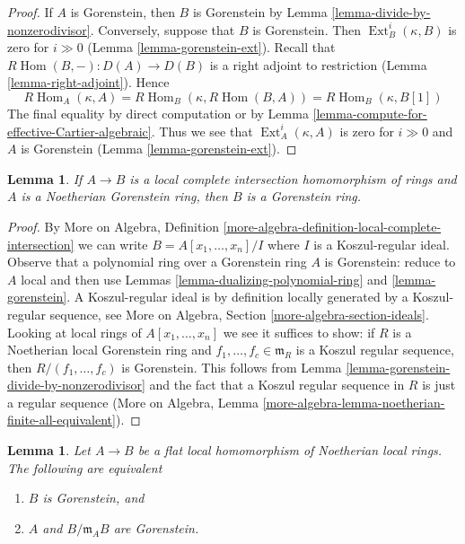 \documentclass{stacks-project}
\theoremstyle{plain}
\newtheorem{lemma}[subsection]{Lemma}
\theoremstyle{definition}
\theoremstyle{remark}
\numberwithin{equation}{subsection}
\def\Hom{\mathop{\mathrm{Hom}}\nolimits}
\def\Ext{\mathop{\mathrm{Ext}}\nolimits}
\begin{document}
\begin{proof}
If $A$ is Gorenstein, then $B$ is Gorenstein by
Lemma \ref{lemma-divide-by-nonzerodivisor}.
Conversely, suppose that $B$ is Gorenstein. Then
$\Ext^i_B(\kappa, B)$ is zero for $i \gg 0$
(Lemma \ref{lemma-gorenstein-ext}).
Recall that $R\Hom(B, -) : D(A) \to D(B)$ is a right adjoint
to restriction (Lemma \ref{lemma-right-adjoint}).
Hence
$$
R\Hom_A(\kappa, A) = R\Hom_B(\kappa, R\Hom(B, A)) =
R\Hom_B(\kappa, B[1])
$$
The final equality by direct computation or by
Lemma \ref{lemma-compute-for-effective-Cartier-algebraic}.
Thus we see that $\Ext^i_A(\kappa, A)$ is zero for
$i \gg 0$ and $A$ is Gorenstein (Lemma \ref{lemma-gorenstein-ext}).
\end{proof}

\begin{lemma}
\label{lemma-gorenstein-lci}
If $A \to B$ is a local complete intersection homomorphism of rings and
$A$ is a Noetherian Gorenstein ring, then $B$ is a Gorenstein ring.
\end{lemma}

\begin{proof}
By More on Algebra, Definition
\ref{more-algebra-definition-local-complete-intersection}
we can write $B = A[x_1, \ldots, x_n]/I$
where $I$ is a Koszul-regular ideal. Observe that a polynomial
ring over a Gorenstein ring $A$ is Gorenstein: reduce to
$A$ local and then use Lemmas \ref{lemma-dualizing-polynomial-ring} and
\ref{lemma-gorenstein}.
A Koszul-regular ideal is by definition locally generated
by a Koszul-regular sequence, see More on Algebra, Section
\ref{more-algebra-section-ideals}.
Looking at local rings of $A[x_1, \ldots, x_n]$
we see it suffices to show: if $R$ is a Noetherian local
Gorenstein ring and $f_1, \ldots, f_c \in \mathfrak m_R$
is a Koszul regular sequence, then $R/(f_1, \ldots, f_c)$ is Gorenstein.
This follows from
Lemma \ref{lemma-gorenstein-divide-by-nonzerodivisor} and
the fact that a Koszul regular sequence in $R$ is just a
regular sequence (More on Algebra, Lemma
\ref{more-algebra-lemma-noetherian-finite-all-equivalent}).
\end{proof}

\begin{lemma}
\label{lemma-flat-under-gorenstein}
Let $A \to B$ be a flat local homomorphism of Noetherian local rings.
The following are equivalent
\begin{enumerate}
\item $B$ is Gorenstein, and
\item $A$ and $B/\mathfrak m_A B$ are Gorenstein.
\end{enumerate}
\end{lemma}
\end{document}
